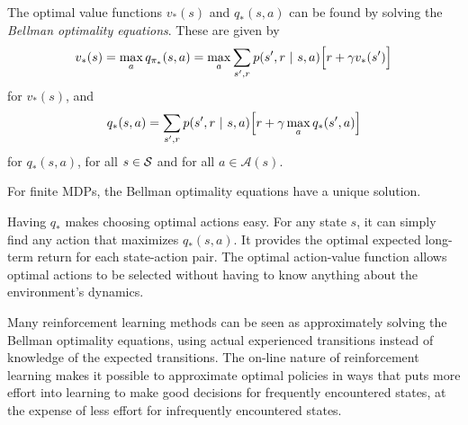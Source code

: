 The optimal value functions $v_*(s)$ and $q_*(s,a)$ can be found by solving the \textit{Bellman optimality equations}. These are given by
\begin{equation}
    v_*(s) = \max\limits_a q_{\pi_*}(s,a) = \max\limits_a \sum_{s', r} p(s', r \cbar s, a) \Bigr[r + \gamma v_*(s')\Bigr]
\end{equation}
for $v_*(s)$, and
\begin{equation}
    q_*(s, a) = \sum_{s', r} p(s', r \cbar s, a) \Bigr[r + \gamma \max\limits_a q_*(s', a)\Bigr]
\end{equation}
for $q_*(s, a)$, for all $s \in \S$ and for all $a \in \mathcal{A}(s)$.

For finite MDPs, the Bellman optimality equations have a unique solution.

Having $q_*$ makes choosing optimal actions easy. For any state $s$, it can simply find any action that maximizes $q_*(s, a)$. It provides the optimal expected long-term return for each state-action pair. The optimal action-value function allows optimal actions to be selected without having to know anything about the environment’s dynamics.

Many reinforcement learning methods can be seen as approximately solving the Bellman optimality equations, using actual experienced transitions instead of knowledge of the expected transitions. The on-line nature of reinforcement learning makes it possible to approximate optimal policies in ways that puts more effort into learning to make good decisions for frequently encountered states, at the expense of less effort for infrequently encountered states.

